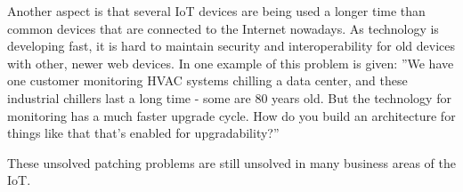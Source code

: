\documentclass[conference]{IEEEtran}
\begin{document}
Another aspect is that several IoT devices are being used a longer time than 
common devices that are connected to the Internet nowadays. As technology is 
developing fast, it is hard to maintain security and interoperability for old 
devices with other, newer web devices. In \cite{arstechnicaPage} one example of 
this problem is given: ''We have one customer monitoring HVAC systems chilling 
a data center, and these industrial chillers last a long time - some are 80 
years old. But the technology for monitoring has a much faster upgrade cycle. 
How do you build an architecture for things like that that's enabled for  
upgradability?'' 

These unsolved patching problems are still unsolved in many business areas of 
the IoT. 



%
%



%
%
\end{document}

